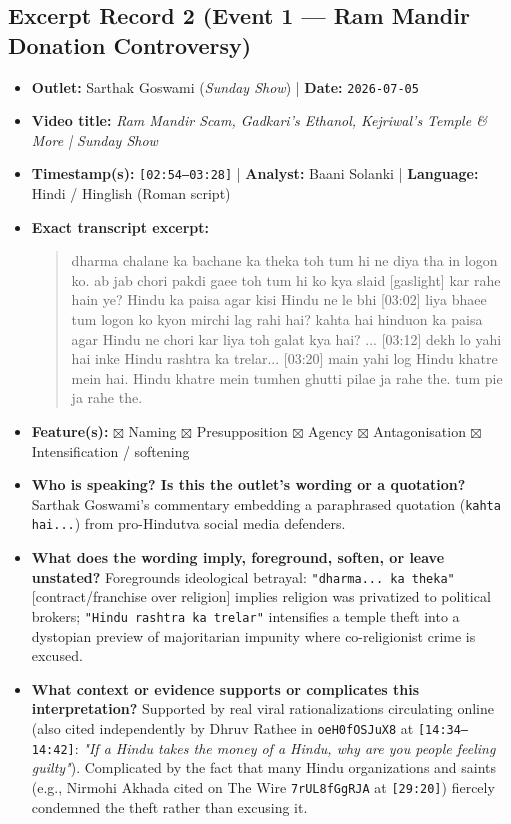 \documentclass[10pt,a4paper]{article}
\begin{document}
\subsection*{Excerpt Record 2 (Event 1 --- Ram Mandir Donation Controversy)}
\begin{itemize}[leftmargin=1.5em, itemsep=3pt, topsep=4pt]
  \item \textbf{Outlet:} Sarthak Goswami (\textit{Sunday Show}) | \textbf{Date:} \texttt{2026-07-05}
  \item \textbf{Video title:} \textit{Ram Mandir Scam, Gadkari's Ethanol, Kejriwal's Temple \& More | Sunday Show}
  \item \textbf{Timestamp(s):} \texttt{[02:54--03:28]} | \textbf{Analyst:} Baani Solanki | \textbf{Language:} Hindi / Hinglish (Roman script)
  \item \textbf{Exact transcript excerpt:}
    \begin{quote}\small\ttfamily [02:54] dharma chalane ka bachane ka theka toh tum hi ne diya tha in logon ko. ab jab chori pakdi gaee toh tum hi ko kya slaid [gaslight] kar rahe hain ye? Hindu ka paisa agar kisi Hindu ne le bhi [03:02] liya bhaee tum logon ko kyon mirchi lag rahi hai? kahta hai hinduon ka paisa agar Hindu ne chori kar liya toh galat kya hai? ... [03:12] dekh lo yahi hai inke Hindu rashtra ka trelar... [03:20] main yahi log Hindu khatre mein hai. Hindu khatre mein tumhen ghutti pilae ja rahe the. tum pie ja rahe the.\end{quote}
  \item \textbf{Feature(s):} $\boxtimes$ Naming $\boxtimes$ Presupposition $\boxtimes$ Agency $\boxtimes$ Antagonisation $\boxtimes$ Intensification / softening
  \item \textbf{Who is speaking? Is this the outlet's wording or a quotation?} Sarthak Goswami's commentary embedding a paraphrased quotation (\texttt{kahta hai...}) from pro-Hindutva social media defenders.
  \item \textbf{What does the wording imply, foreground, soften, or leave unstated?} Foregrounds ideological betrayal: \texttt{"dharma... ka theka"} [contract/franchise over religion] implies religion was privatized to political brokers; \texttt{"Hindu rashtra ka trelar"} intensifies a temple theft into a dystopian preview of majoritarian impunity where co-religionist crime is excused.
  \item \textbf{What context or evidence supports or complicates this interpretation?} Supported by real viral rationalizations circulating online (also cited independently by Dhruv Rathee in \texttt{oeH0fOSJuX8} at \texttt{[14:34--14:42]}: \textit{"If a Hindu takes the money of a Hindu, why are you people feeling guilty"}). Complicated by the fact that many Hindu organizations and saints (e.g., Nirmohi Akhada cited on The Wire \texttt{7rUL8fGgRJA} at \texttt{[29:20]}) fiercely condemned the theft rather than excusing it.

\end{itemize}
\end{document}
